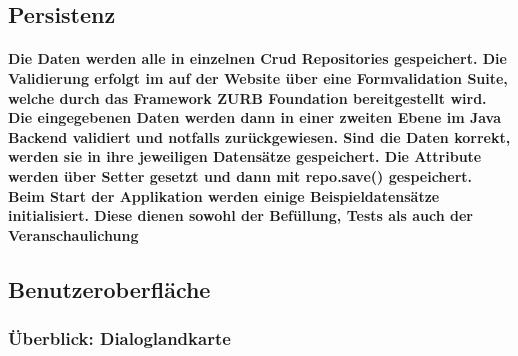 \documentclass[a4paper]{article}
\begin{document}
\subsection{Persistenz}

\paragraph{Die Daten werden alle in einzelnen Crud Repositories gespeichert. Die Validierung erfolgt im auf der Website über eine Formvalidation Suite, welche durch das Framework ZURB Foundation bereitgestellt wird. Die eingegebenen Daten werden dann in einer zweiten Ebene im Java Backend validiert und notfalls zurückgewiesen. Sind die Daten korrekt, werden sie in ihre jeweiligen Datensätze gespeichert. Die Attribute werden über Setter gesetzt und dann mit repo.save() gespeichert. Beim Start der Applikation werden einige Beispieldatensätze initialisiert. Diese dienen sowohl der Befüllung, Tests als auch der Veranschaulichung}

\subsection{Benutzeroberfläche}

\subsubsection{Überblick: Dialoglandkarte}
\end{document}
